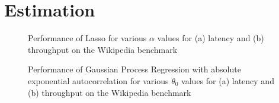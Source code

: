 \section{Estimation} \label{sec:estimation}

\begin{figure}
\centering
{}

\caption{Performance of Lasso for various $\alpha$ values for (a)
  latency and (b) throughput on the Wikipedia benchmark}
\label{fig:lasso_alphas}
\end{figure}

\begin{figure}
\centering
{}

\caption{Performance of Gaussian Process Regression with absolute
  exponential autocorrelation for various $\theta_0$ values for (a)
  latency and (b) throughput on the Wikipedia benchmark}
\label{fig:gp_theta0s}
\end{figure}

